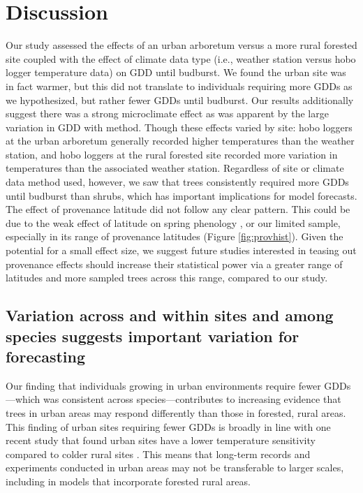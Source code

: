 \documentclass{article}\usepackage[]{graphicx}\usepackage[]{color}
\begin{document}
\section*{Discussion} 
Our study assessed the effects of an urban arboretum versus a more rural forested site coupled with the effect of climate data type (i.e., weather station versus hobo logger temperature data) on GDD until budburst. We found the urban site was in fact warmer, but this did not translate to individuals requiring more GDDs as we hypothesized, but rather fewer GDDs until budburst. Our results additionally suggest there was a strong microclimate effect as was apparent by the large variation in GDD with method. Though these effects varied by site: hobo loggers at the urban arboretum generally recorded higher temperatures than the weather station, and hobo loggers at the rural forested site recorded more variation in temperatures than the associated weather station. Regardless of site or climate data method used, however, we saw that trees consistently required more GDDs until budburst than shrubs, which has important implications for model forecasts. The effect of provenance latitude did not follow any clear pattern. This could be due to the weak effect of latitude on spring phenology \citep{Gauzere2017}, or our limited sample, especially in its range of provenance latitudes (Figure \ref{fig:provhist}). Given the potential for a small effect size, we suggest future studies interested in teasing out provenance effects should increase their statistical power via a greater range of latitudes and more sampled trees across this range, compared to our study. 

\subsection*{Variation across and within sites and among species suggests important variation for forecasting} 
Our finding that individuals growing in urban environments require fewer GDDs---which was consistent across species---contributes to increasing evidence that trees in urban areas may respond differently than those in forested, rural areas. This finding of urban sites requiring fewer GDDs is broadly in line with one recent study that found urban sites have a lower temperature sensitivity compared to colder rural sites \citep{Meng2020}. This means that long-term records and experiments conducted in urban areas may not be transferable to larger scales, including in models that incorporate forested rural areas. 
\end{document}
